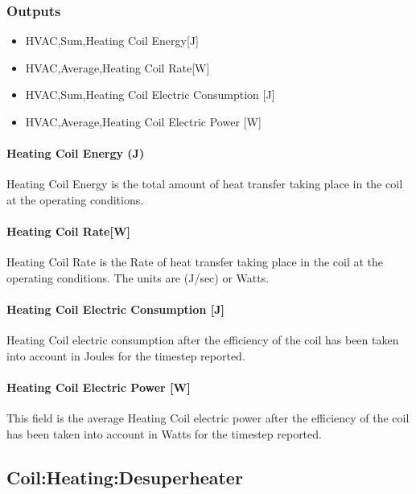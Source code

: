 \subsubsection{Outputs}\label{outputs-3-009}

\begin{itemize}
\item
  HVAC,Sum,Heating Coil Energy{[}J{]}
\item
  HVAC,Average,Heating Coil Rate{[}W{]}
\item
  HVAC,Sum,Heating Coil Electric Consumption {[}J{]}
\item
  HVAC,Average,Heating Coil Electric Power {[}W{]}
\end{itemize}

\paragraph{Heating Coil Energy (J)}\label{heating-coil-energy-j}

Heating Coil Energy is the total amount of heat transfer taking place in the coil at the operating conditions.

\paragraph{Heating Coil Rate{[}W{]}}\label{heating-coil-ratew}

Heating Coil Rate is the Rate of heat transfer taking place in the coil at the operating conditions. The units are (J/sec) or Watts.

\paragraph{Heating Coil Electric Consumption {[}J{]}}\label{heating-coil-electric-consumption-j}

Heating Coil electric consumption after the efficiency of the coil has been taken into account in Joules for the timestep reported.

\paragraph{Heating Coil Electric Power {[}W{]}}\label{heating-coil-electric-power-w-1}

This field is the average Heating Coil electric power after the efficiency of the coil has been taken into account in Watts for the timestep reported.

\subsection{Coil:Heating:Desuperheater}\label{coilheatingdesuperheater}

